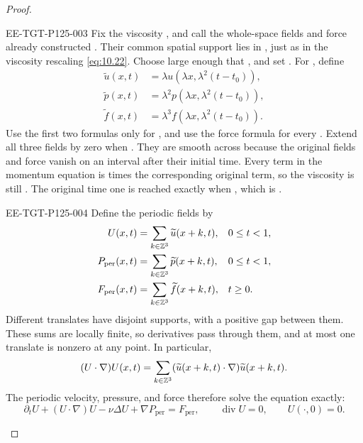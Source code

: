 \begin{proof}
\begin{EESegment}{EE-TGT-P125-003}
Fix the viscosity , and call the whole-space fields and force
already constructed . Their common spatial support lies in
, just as in the viscosity
rescaling \eqref{eq:10.22}. Choose  large enough that
, and set
. For , define
\[
\begin{aligned}
  \widetilde u(x,t)&=\lambda u(\lambda x,\lambda^2(t-t_0)),\\
  \widetilde p(x,t)&=\lambda^2p(\lambda x,\lambda^2(t-t_0)),\\
  \widetilde f(x,t)&=\lambda^3f(\lambda x,\lambda^2(t-t_0)).
\end{aligned}
\]
Use the first two formulas only for , and use the force formula
for every . Extend all three fields by zero when
. They are smooth across
 because the original fields and force vanish on an interval
after their initial time. Every term in the momentum equation is
 times the corresponding original term, so the viscosity
is still . The original time one is reached exactly when
, which is
.
\end{EESegment}

\begin{EESegment}{EE-TGT-P125-004}
Define the periodic fields by
\[
\begin{aligned}
  U(x,t)&=\sum_{k\in\mathbb{Z}^3}\widetilde u(x+k,t),&&0\leq t<1,\\
  P_{\mathrm{per}}(x,t)&=\sum_{k\in\mathbb{Z}^3}\widetilde p(x+k,t),&&0\leq t<1,\\
  F_{\mathrm{per}}(x,t)&=\sum_{k\in\mathbb{Z}^3}\widetilde f(x+k,t),&&t\geq0.
\end{aligned}
\]
Different translates have disjoint supports, with a positive gap between them. These sums
are locally finite, so derivatives pass through them, and at most one translate is nonzero
at any point. In particular,
\[
  (U\cdot\nabla)U(x,t)
  =\sum_{k\in\mathbb{Z}^3}(\widetilde u(x+k,t)\cdot\nabla)\widetilde u(x+k,t).
\]
The periodic velocity, pressure, and force therefore solve the equation exactly:
\[
  \partial_tU+(U\cdot\nabla)U-\nu\Delta U+\nabla P_{\mathrm{per}}
  =F_{\mathrm{per}},\qquad
  \operatorname{div}U=0,\qquad U(\cdot,0)=0.
\]
\end{EESegment}


\end{proof}
